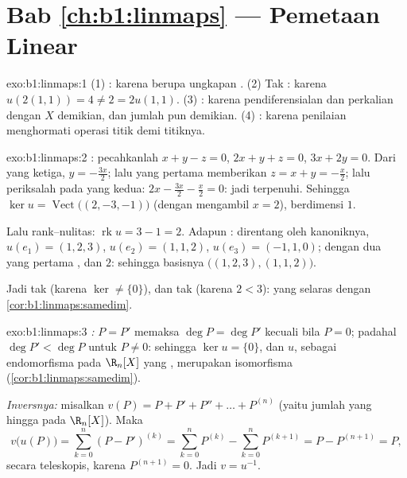\section*{Bab \ref{ch:b1:linmaps} --- Pemetaan Linear}

\begin{solution}{exo:b1:linmaps:1}
(1) : karena  berupa ungkapan . (2) Tak :
karena $u(2(1,1)) = 4 \neq 2 = 2u(1,1)$. (3) : karena pendiferensialan dan
perkalian dengan $X$ demikian, dan jumlah  pun demikian. (4) :
karena penilaian menghormati operasi titik demi titiknya.
\end{solution}

\begin{solution}{exo:b1:linmaps:2}
: pecahkanlah $x + y - z = 0$, $2x + y + z = 0$, $3x + 2y = 0$.
Dari yang ketiga, $y = -\frac{3x}{2}$; lalu yang pertama memberikan $z = x + y =
-\frac x2$; lalu periksalah pada yang kedua: $2x - \frac{3x}{2} - \frac x2 = 0$:
jadi terpenuhi. Sehingga $\ker u = \operatorname{Vect}\bigl((2, -3, -1)\bigr)$
(dengan mengambil $x = 2$), berdimensi $1$.

Lalu rank--nulitas: $\operatorname{rk} u = 3 - 1 = 2$. Adapun : direntang oleh
  kanoniknya, $u(e_1) = (1,2,3)$, $u(e_2) =
(1,1,2)$, $u(e_3) = (-1,1,0)$; dengan dua yang pertama , dan 
$2$: sehingga basisnya $\bigl((1,2,3), (1,1,2)\bigr)$.

Jadi tak  (karena $\ker \neq \{0\}$), dan tak  (karena  $2 < 3$):
yang selaras dengan \cref{cor:b1:linmaps:samedim}.
\end{solution}

\begin{solution}{exo:b1:linmaps:3}
\emph{:} $P = P'$ memaksa $\deg P = \deg P'$ kecuali bila $P = 0$;
padahal $\deg P' < \deg P$ untuk $P \neq 0$: sehingga $\ker u = \{0\}$, dan $u$,
sebagai endomorfisma  pada $\R_n[X]$ yang , merupakan
isomorfisma (\cref{cor:b1:linmaps:samedim}).

\emph{Inversnya:} misalkan $v(P) = P + P' + P'' + \dots + P^{(n)}$ (yaitu
jumlah yang hingga pada $\R_n[X]$). Maka
\[
v\bigl(u(P)\bigr) = \sum_{k=0}^{n} (P - P')^{(k)}
= \sum_{k=0}^{n} P^{(k)} - \sum_{k=0}^{n} P^{(k+1)}
= P - P^{(n+1)} = P ,
\]
secara teleskopis, karena $P^{(n+1)} = 0$. Jadi $v = u^{-1}$.
\end{solution}

